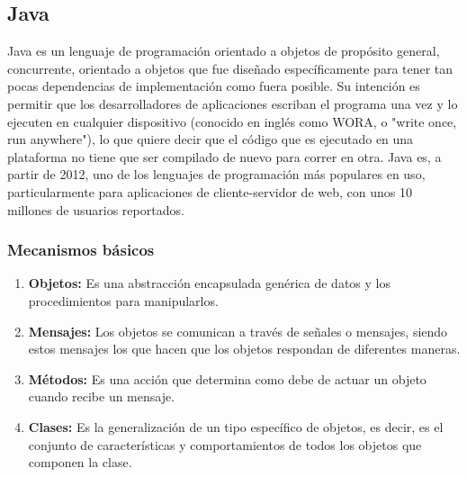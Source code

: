 \subsection{Java}
Java es un lenguaje de programación orientado a objetos de propósito general, concurrente,  orientado a objetos que fue diseñado específicamente para tener tan pocas dependencias de implementación como fuera posible. Su intención es permitir que los desarrolladores de aplicaciones escriban el programa una vez y lo ejecuten en cualquier dispositivo (conocido en inglés como WORA, o "write once, run anywhere"), lo que quiere decir que el código que es ejecutado en una plataforma no tiene que ser compilado de nuevo para correr en otra. Java es, a partir de 2012, uno de los lenguajes de programación más populares en uso, particularmente para aplicaciones de cliente-servidor de web, con unos 10 millones de usuarios reportados. \cite{JAVA}
\subsubsection{Mecanismos básicos}
\begin{enumerate}
\item \textbf{Objetos:}
 Es una abstracción encapsulada genérica de datos y los procedimientos para manipularlos.
\item \textbf{Mensajes:}
Los objetos se comunican a través de señales o mensajes, siendo estos mensajes los que hacen que los objetos respondan de diferentes maneras.
\item \textbf{Métodos:}
Es una acción que determina como debe de actuar un objeto cuando recibe un mensaje.
\item \textbf{Clases:}
Es la generalización de un tipo específico de objetos, es decir, es el conjunto de características y comportamientos de todos los objetos que componen la clase.
\end{enumerate}
